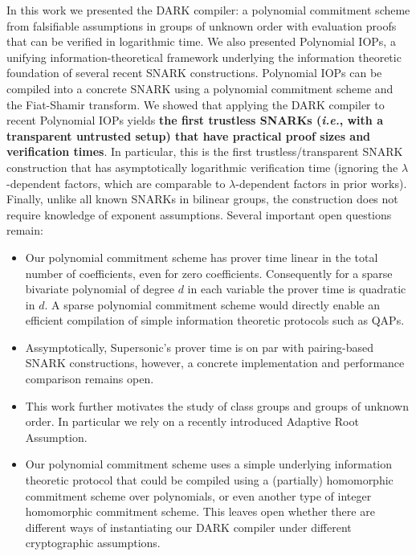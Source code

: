 In this work we presented the DARK compiler: a polynomial commitment scheme from falsifiable assumptions in groups of unknown order with evaluation proofs that can be verified in logarithmic time. We also presented Polynomial IOPs, a unifying information-theoretical framework underlying the information theoretic foundation of several recent SNARK constructions. Polynomial IOPs can be compiled into a concrete SNARK using a polynomial commitment scheme and the Fiat-Shamir transform. We showed that applying the DARK compiler to recent Polynomial IOPs yields \textbf{the first trustless SNARKs (\emph{i.e.}, with a transparent untrusted setup) that have practical proof sizes and verification times}. In particular, this is the first trustless/transparent SNARK construction that has asymptotically logarithmic verification time (ignoring the $\lambda$-dependent factors, which are comparable to $\lambda$-dependent factors in prior works). Finally, unlike all known SNARKs in bilinear groups, the construction does not require knowledge of exponent assumptions.
Several important open questions remain:

\begin{itemize}
    \item Our polynomial commitment scheme has prover time linear in the total number of coefficients, even for zero coefficients. Consequently for a sparse bivariate polynomial of degree $d$ in each variable the prover time is quadratic in $d$. A sparse polynomial commitment scheme would directly enable an efficient compilation of simple information theoretic protocols such as QAPs.
    \item Assymptotically, \textsf{Supersonic}'s prover time is on par with pairing-based SNARK constructions, however, a concrete implementation and performance comparison remains open.
    \item This work further motivates the study of class groups and groups of unknown order. In particular we rely on a recently introduced Adaptive Root Assumption.
    \item Our polynomial commitment scheme uses a simple underlying information theoretic protocol that could be compiled using a (partially) homomorphic commitment scheme over polynomials, or even another type of integer homomorphic commitment scheme. This leaves open whether there are different ways of instantiating our DARK compiler under different cryptographic assumptions. 
    
\end{itemize}


